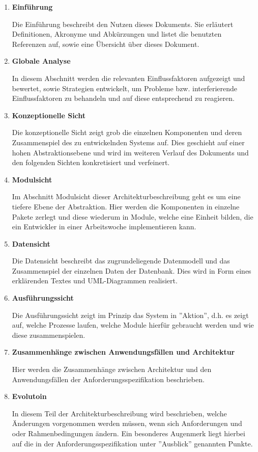 \documentclass[fontsize=12pt,paper=a4,twoside]{scrartcl}
\begin{document}
\begin{enumerate}
\item{\textbf{Einführung}}

Die Einführung beschreibt den Nutzen dieses Dokuments. Sie erläutert Definitionen, Akronyme und Abkürzungen und listet die benutzten Referenzen auf, sowie eine Übersicht über dieses Dokument.

\item{\textbf{Globale Analyse}}

In diesem Abschnitt werden die relevanten Einflussfaktoren aufgezeigt und bewertet, sowie Strategien entwickelt, um Probleme bzw. interferierende Einflussfaktoren zu behandeln und auf diese entsprechend zu reagieren.

\item{\textbf{Konzeptionelle Sicht}}

Die konzeptionelle Sicht zeigt grob die einzelnen Komponenten und deren Zusammenspiel des zu entwickelnden Systems auf. Dies geschieht auf einer hohen Abstraktionsebene und wird im weiteren Verlauf des Dokuments und den folgenden Sichten konkretisiert und verfeinert.

\item{\textbf{Modulsicht}}

Im Abschnitt Modulsicht dieser Architekturbeschreibung geht es um eine tiefere Ebene der Abstraktion. Hier werden die Komponenten in einzelne Pakete zerlegt und diese wiederum in Module, welche eine Einheit bilden, die ein Entwickler in einer Arbeitswoche implementieren kann.

\item{\textbf{Datensicht}}

Die Datensicht beschreibt das zugrundeliegende Datenmodell und das Zusammenspiel der einzelnen Daten der Datenbank. Dies wird in Form eines erklärenden Textes und UML-Diagrammen realisiert.

\item{\textbf{Ausführungssicht}}

Die Ausführungssicht zeigt im Prinzip das System in ''Aktion'', d.h. es zeigt auf, welche Prozesse laufen, welche Module hierfür gebraucht werden und wie diese zusammenspielen.

\item{\textbf{Zusammenhänge zwischen Anwendungsfällen und Architektur}}

Hier werden die Zusammenhänge zwischen Architektur und den Anwendungsfällen der Anforderungsspezifikation beschrieben.

\item{\textbf{Evolutoin}}

In diesem Teil der Architekturbeschreibung wird beschrieben, welche Änderungen vorgenommen werden müssen, wenn sich Anforderungen und oder Rahmenbedingungen ändern. Ein besonderes Augenmerk liegt hierbei auf die in der Anforderungsspezifikation unter ''Ausblick'' genannten Punkte.

\end{enumerate}
\end{document}
